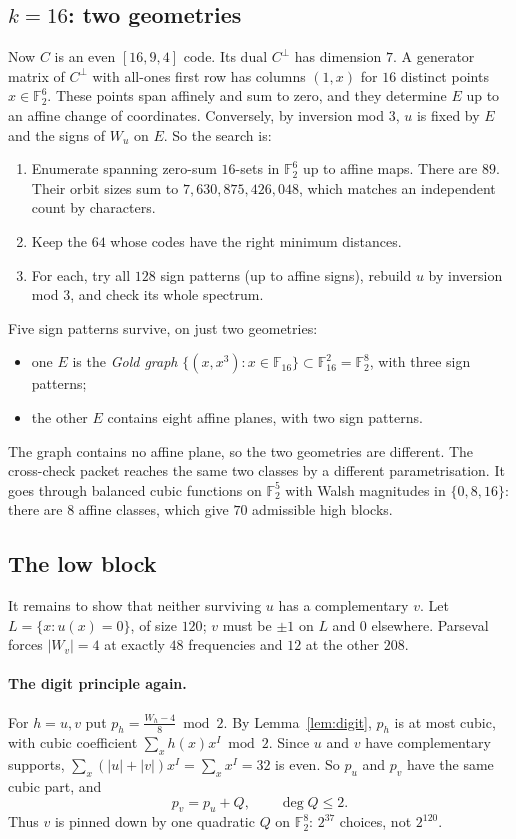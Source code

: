 \documentclass[11pt]{article}
\theoremstyle{definition}
\theoremstyle{remark}
\newcommand{\F}{\mathbb{F}}
\DeclareRobustCommand{\_}{\textunderscore\allowbreak}
\begin{document}
\subsection{\texorpdfstring{$k=16$}{k=16}: two geometries}
Now $C$ is an even $[16,9,4]$ code. Its dual $C^\perp$ has dimension $7$. A generator matrix of $C^\perp$ with all-ones first row has columns $(1,x)$ for $16$ distinct points $x\in\F_2^6$. These points span affinely and sum to zero, and they determine $E$ up to an affine change of coordinates. Conversely, by inversion mod $3$, $u$ is fixed by $E$ and the signs of $W_u$ on $E$. So the search is:
\begin{enumerate}[nosep]
  \item Enumerate spanning zero-sum $16$-sets in $\F_2^6$ up to affine maps. There are $89$. Their orbit sizes sum to $7{,}630{,}875{,}426{,}048$, which matches an independent count by characters.
  \item Keep the $64$ whose codes have the right minimum distances.
  \item For each, try all $128$ sign patterns (up to affine signs), rebuild $u$ by inversion mod $3$, and check its whole spectrum.
\end{enumerate}
Five sign patterns survive, on just two geometries:
\begin{itemize}[nosep]
  \item one $E$ is the \emph{Gold graph} $\{(x,x^3):x\in\F_{16}\}\subset\F_{16}^2=\F_2^8$, with three sign patterns;
  \item the other $E$ contains eight affine planes, with two sign patterns.
\end{itemize}
The graph contains no affine plane, so the two geometries are different. The cross-check packet reaches the same two classes by a different parametrisation. It goes through balanced cubic functions on $\F_2^5$ with Walsh magnitudes in $\{0,8,16\}$: there are $8$ affine classes, which give $70$ admissible high blocks.

\subsection{The low block}
It remains to show that neither surviving $u$ has a complementary $v$. Let $L=\{x:u(x)=0\}$, of size $120$; $v$ must be $\pm1$ on $L$ and $0$ elsewhere. Parseval forces $|W_v|=4$ at exactly $48$ frequencies and $12$ at the other $208$.

\paragraph{The digit principle again.} For $h=u,v$ put $p_h=\frac{W_h-4}{8}\bmod2$. By Lemma~\ref{lem:digit}, $p_h$ is at most cubic, with cubic coefficient $\sum_xh(x)x^I\bmod2$. Since $u$ and $v$ have complementary supports, $\sum_x(|u|+|v|)x^I=\sum_xx^I=32$ is even. So $p_u$ and $p_v$ have the same cubic part, and
\[
  p_v=p_u+Q,\qquad\deg Q\le2 .
\]
Thus $v$ is pinned down by one quadratic $Q$ on $\F_2^8$: $2^{37}$ choices, not $2^{120}$.
\end{document}
